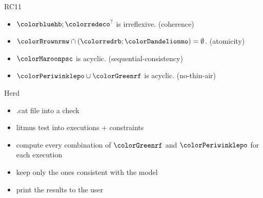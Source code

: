 \documentclass[dvipsnames,svgnames,beamer]{beamer}
\begin{document}
\begin{frame}{RC11}

	\vfill
	\begin{itemize}
	\item $\hb ; \eco ^?$ is irreflexive. \hfill (coherence)
	\item $\rmw \cap (\rb ; \mo) = \emptyset$. \hfill (atomicity)
	\item $\psc$ is acyclic. \hfill (sequential-consistency)
	\item $\po \cup \rf$ is acyclic. \hfill (no-thin-air)
	\end{itemize}
	\vfill

\end{frame}

\begin{frame}{Herd}

	
	\begin{itemize}
	
	\item .cat file into a check
	\item litmus test into executions + constraints
	\item compute every combination of $\rf$ and $\po$ for each execution
	\item keep only the ones consistent with the model
	\item print the results to the user
	
	\end{itemize}

\end{frame}
\end{document}
